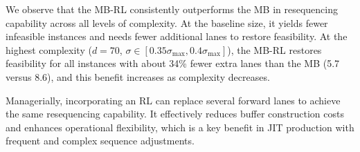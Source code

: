 \documentclass[12pt]{article}
\begin{document}
We observe that the MB-RL consistently outperforms the MB in resequencing capability across all levels of complexity. At the baseline size, it yields fewer infeasible instances and needs fewer additional lanes to restore feasibility. At the highest complexity ($d=70$, $\sigma\in [0.35\sigma_{\text{max}},0.4\sigma_{\text{max}}]$), the MB-RL restores feasibility for all instances with about 34\% fewer extra lanes than the MB (5.7 versus 8.6), and this benefit increases as complexity decreases.

Managerially, incorporating an RL can replace several forward lanes to achieve the same resequencing capability. It effectively reduces buffer construction costs and enhances operational flexibility, which is a key benefit in JIT production with frequent and complex sequence adjustments.


\end{document}
